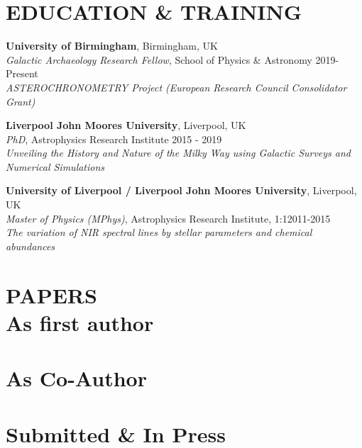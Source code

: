 \documentclass[margin]{res}
\begin{document}
\begin{resume}
\section{EDUCATION \& TRAINING}
\textbf{University of Birmingham}, Birmingham, UK\\
{\sl Galactic Archaeology Research Fellow}, School of Physics \& Astronomy \hfill 2019-Present\\
\emph{ASTEROCHRONOMETRY Project (European Research Council Consolidator Grant)}

\textbf{Liverpool John Moores University}, Liverpool, UK\\
{\sl PhD}, Astrophysics Research Institute \hfill 2015 - 2019\\
\emph{Unveiling the History and Nature of the Milky Way using Galactic Surveys and Numerical Simulations}

\textbf{University of Liverpool / Liverpool John Moores University}, Liverpool, UK\\
{\sl Master of Physics (MPhys)}, Astrophysics Research Institute, 1:1\hfill 2011-2015
\\
\emph{The variation of NIR spectral lines by stellar parameters and chemical abundances}



\section{PAPERS\\ As first author}
\begin{itemize}

\end{itemize}
\section{As Co-Author}
\begin{itemize}

\end{itemize}
\newpage
\section{Submitted \& In Press}
\begin{itemize}

\end{itemize}

\end{resume}
\end{document}
